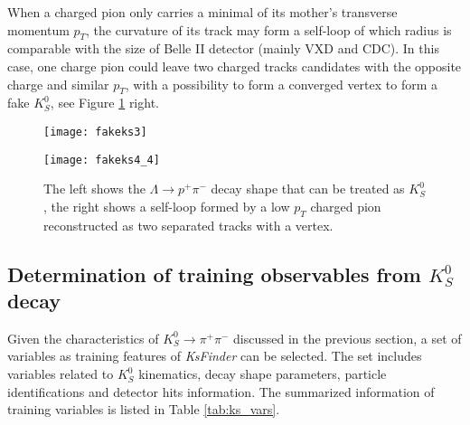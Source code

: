 When a charged pion only carries a minimal of its mother's transverse momentum $p_T$, the curvature of its track may form a self-loop of which radius is comparable with the size of Belle II detector (mainly VXD and CDC). In this case, one charge pion could leave two charged tracks candidates with the opposite charge and similar $p_T$, with a possibility to form a converged vertex to form a fake $K_S^0$, see Figure \ref{fig:fakeks2} right.

\begin{figure}[htbp]
	\begin{minipage}[t]{0.5\linewidth} %
		\centering 
		\texttt{[image: fakeks3]} 
		\label{fig:side:a} 
	\end{minipage}%
	\begin{minipage}[t]{0.5\linewidth} 
		\centering 
		\texttt{[image: fakeks4\_4]} 
		\label{fig:side:b} 
	\end{minipage}%
	
	\caption{The left shows the $\Lambda \to p^+ \pi^-$ decay shape that can be treated as $K_S^0$, the right shows a self-loop formed by a low $p_T$ charged pion reconstructed as two separated tracks with a vertex.}
	\label{fig:fakeks2}
\end{figure}

\subsection{Determination of training observables from $K_S^0$ decay }
Given the characteristics of  $K_S^0 \to \pi^+ \pi^-$ discussed in the previous section, a set of variables as training features of \textit{KsFinder} can be selected. The set includes variables related to $K_S^0$ kinematics, decay shape parameters, particle identifications and detector hits information. The summarized information of training variables is listed in Table \ref{tab:ks_vars}.

